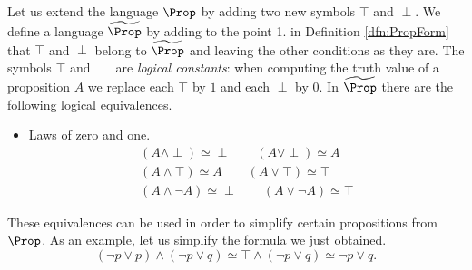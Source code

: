 Let us extend the language $\Prop$ by adding two new symbols $\top$ and $\perp$.
We define a language $\widetilde{\Prop}$ by adding to the point 1. in Definition \ref{dfn:PropForm} that $\top$ and $\perp$ belong to $\widetilde{\Prop}$
and leaving the other conditions as they are.
The symbols $\top$ and $\perp$ are \emph{logical constants}: when computing the truth value of a proposition $A$
we replace each $\top$ by $1$ and each $\perp$ by $0$.
In $\widetilde{\Prop}$ there are the following logical equivalences.
\begin{itemize}
\item
Laws of zero and one.
\begin{gather*}
(A \wedge \perp) \simeq \perp \qquad (A \vee \perp) \simeq A\\
(A \wedge \top) \simeq A \qquad (A \vee \top) \simeq \top\\
(A \wedge \neg A) \simeq \perp \qquad (A \vee \neg A) \simeq \top
\end{gather*}
\end{itemize}

These equivalences can be used in order to simplify certain propositions from $\Prop$.
As an example, let us simplify the formula we just obtained.
\[
(\neg p \vee p) \wedge (\neg p \vee q) \simeq \top \wedge (\neg p \vee q) \simeq \neg p \vee q.
\]





